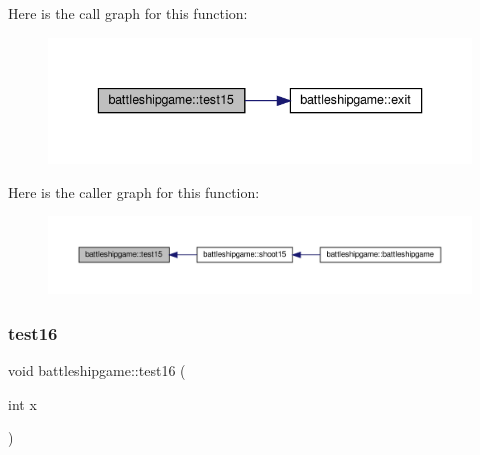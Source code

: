 Here is the call graph for this function\+:
\nopagebreak
\begin{figure}[H]
\begin{center}
\leavevmode
\includegraphics[width=336pt]{classbattleshipgame_a7d5c9884fcb1d37853a7e25438fe3bf3_cgraph}
\end{center}
\end{figure}
Here is the caller graph for this function\+:
\nopagebreak
\begin{figure}[H]
\begin{center}
\leavevmode
\includegraphics[width=350pt]{classbattleshipgame_a7d5c9884fcb1d37853a7e25438fe3bf3_icgraph}
\end{center}
\end{figure}
\mbox{\label{classbattleshipgame_a24b68bab1498b0d2841ca1e2127d81c7}} 
\subsubsection{\texorpdfstring{test16}{test16}}
{\footnotesize\ttfamily void battleshipgame\+::test16 (\begin{DoxyParamCaption}\item[{int}]{x }\end{DoxyParamCaption})\hspace{0.3cm}{\ttfamily [slot]}}

